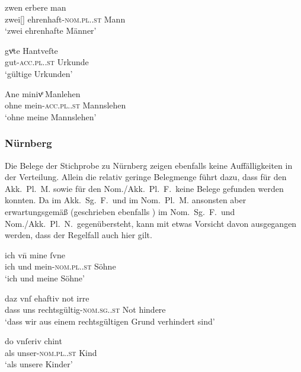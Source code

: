 \begin{exe}
\ex \label{ex:adjaugs}
	\begin{xlist}
	\ex \label{ex:adjaugs_1}
		\gll zwen erbere man \\
			zwei[\MascM] ehrenhaft-\textsc{nom.pl.\MascM.st} Mann \\
		\trans `zwei ehrenhafte Männer'
			\parencites(Nr.~1270, Augsburg, 1290)[508,40]{cao2}

	\ex \label{ex:adjaugs_2}
		\gll gvͤte Hantveſte \\
			gut-\textsc{acc.pl.\FemI.st} Urkunde \\
		\trans `gültige Urkunden'
			\parencites(Nr.~3471, Augsburg, 1299)[557,21]{cao4}

	\ex \label{ex:adjaugs_3}
		\gll Ane minivͤ Manlehen \\
			ohne mein-\textsc{acc.pl.\NeutI.st} Mannslehen \\
		\trans `ohne meine Mannslehen'
			\parencites(Nr.~1363, Augsburg, 1291)[586,9]{cao2}
	\end{xlist}
\end{exe}

\subsubsection{Nürnberg}
\label{par:adjnuernberg}
Die Belege der Stichprobe zu Nürnberg zeigen ebenfalls keine Auffälligkeiten in
der Verteilung. Allein die relativ geringe Belegmenge führt dazu, dass für den
Akk.\ Pl.\ M. sowie für den Nom./Akk.\ Pl.\ F.\ keine Belege gefunden werden
konnten. Da  im Akk.\ Sg.\ F.\ und im Nom.\ Pl.\ M. ansonsten aber
erwartungsgemäß  (geschrieben ebenfalls ) im Nom.\ Sg.\ F.\
und Nom./Akk.\ Pl.\ N.\ gegenübersteht, kann mit etwas Vorsicht davon
ausgegangen werden, dass der Regelfall auch hier gilt.

\begin{exe}
\ex \label{ex:adjnuern}
	\begin{xlist}
	\ex \label{ex:adjnuern_1}
		\gll ich vn̄ mine ſvne \\
			ich und mein-\textsc{nom.pl.\MascM.st} Söhne \\
		\trans `ich und meine Söhne'
			\parencites(Nr.~3428, Kl.~Seligenporten, Kr.~Neumarkt in der Oberpfalz, 1299)[525,15]{cao4}

	\ex \label{ex:adjnuern_2}
		\gll daz vnſ ehaftiv not irre \\
			dass uns rechtsgültig-\textsc{nom.sg.\FemI.st} Not hindere \\
		\trans `dass wir aus einem rechtsgültigen Grund verhindert sind'
			\parencites(Nr.~949, Nürnberg, 1287)[301,12--13]{cao2}

	\ex \label{ex:adjnuern_3}
		\gll do vnſeriv chint \\
			als unser-\textsc{nom.pl.\NeutX.st} Kind \\
		\trans `als unsere Kinder'
			\parencites(Nrn.~1972~AB, Nürnberg, 1294)[225,17--18]{cao3}
	\end{xlist}
\end{exe}

